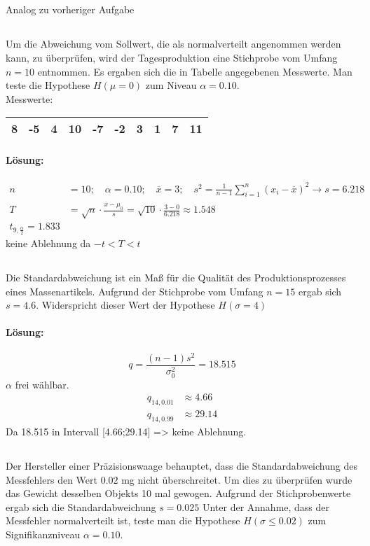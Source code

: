 \documentclass[ngerman]{scrartcl}
\begin{document}
\subsection{}
Analog zu vorheriger Aufgabe
\subsection{}
Um die Abweichung vom Sollwert, die als normalverteilt angenommen werden kann, zu überprüfen, wird der Tagesproduktion eine Stichprobe vom Umfang $n=10$ entnommen. Es ergaben sich die in Tabelle angegebenen Messwerte. Man teste die Hypothese $H(\mu=0)$ zum Niveau $\alpha = 0.10$.\\
Messwerte:\\
\begin{tabular}{c c c c c c c c c c}
\hline
8& -5& 4& 10& -7& -2& 3& 1& 7& 11\\\hline
\end{tabular}
\paragraph{Lösung:}
\begin{align*}
n&=10;\quad \alpha =0.10;\quad \overline{x}=3;\quad s^2=\frac{1}{n-1}\sum_{i=1}^{n}\left(x_i - \overline{x}\right)^2\rightarrow s = 6.218\\
T &= \sqrt{n}\cdot \frac{\overline{x} - \mu_0}{s} = \sqrt{10}\cdot \frac{3 - 0}{6.218}\approx 1.548\\
t_{9,\frac{\alpha}{2}} = 1.833
\end{align*}
keine Ablehnung da $-t<T<t$
\subsection{}
Die Standardabweichung ist ein Maß für die Qualität des Produktionsprozesses eines Massenartikels. Aufgrund der Stichprobe vom Umfang $n=15$ ergab sich $s=4.6$. Widerspricht dieser Wert der Hypothese $H(\sigma = 4)$
\paragraph{Lösung:}
\[
q = \frac{(n-1) s^2}{\sigma_0^2} = 18.515
\]
$\alpha$ frei wählbar.
\begin{align*}
q_{14,0.01} &\approx 4.66 \\
q_{14,0.99} &\approx 29.14
\end{align*}
Da 18.515 in Intervall [4.66;29.14] => keine Ablehnung.
\subsection{}
Der Hersteller einer Präzisionswaage behauptet, dass die Standardabweichung des Messfehlers den Wert $0.02$ mg nicht überschreitet. Um dies zu überprüfen wurde das Gewicht desselben Objekts 10 mal gewogen. Aufgrund der Stichprobenwerte ergab sich die Standardabweichung $s=0.025$ Unter der Annahme, dass der Messfehler normalverteilt ist, teste man die Hypothese $H(\sigma \le 0.02)$ zum Signifikanzniveau $\alpha = 0.10$.
\end{document}
